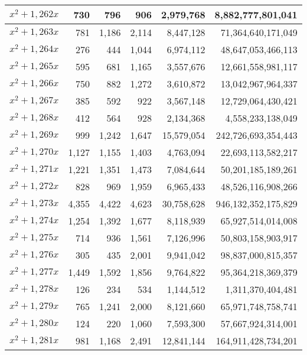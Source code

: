 \documentclass[a4paper]{amsproc}
\theoremstyle{plain}
\begin{document}
\begin{longtable}{ | l | r | r | r | r | r | }
$x^2 + 1{,}262x$ & 730 & 796 & 906 & 2{,}979{,}768 & 8{,}882{,}777{,}801{,}041 \\ \hline
$x^2 + 1{,}263x$ & 781 & 1{,}186 & 2{,}114 & 8{,}447{,}128 & 71{,}364{,}640{,}171{,}049 \\ \hline
$x^2 + 1{,}264x$ & 276 & 444 & 1{,}044 & 6{,}974{,}112 & 48{,}647{,}053{,}466{,}113 \\ \hline
$x^2 + 1{,}265x$ & 595 & 681 & 1{,}165 & 3{,}557{,}676 & 12{,}661{,}558{,}981{,}117 \\ \hline
$x^2 + 1{,}266x$ & 750 & 882 & 1{,}272 & 3{,}610{,}872 & 13{,}042{,}967{,}964{,}337 \\ \hline
$x^2 + 1{,}267x$ & 385 & 592 & 922 & 3{,}567{,}148 & 12{,}729{,}064{,}430{,}421 \\ \hline
$x^2 + 1{,}268x$ & 412 & 564 & 928 & 2{,}134{,}368 & 4{,}558{,}233{,}138{,}049 \\ \hline
$x^2 + 1{,}269x$ & 999 & 1{,}242 & 1{,}647 & 15{,}579{,}054 & 242{,}726{,}693{,}354{,}443 \\ \hline
$x^2 + 1{,}270x$ & 1{,}127 & 1{,}155 & 1{,}403 & 4{,}763{,}094 & 22{,}693{,}113{,}582{,}217 \\ \hline
$x^2 + 1{,}271x$ & 1{,}221 & 1{,}351 & 1{,}473 & 7{,}084{,}644 & 50{,}201{,}185{,}189{,}261 \\ \hline
$x^2 + 1{,}272x$ & 828 & 969 & 1{,}959 & 6{,}965{,}433 & 48{,}526{,}116{,}908{,}266 \\ \hline
$x^2 + 1{,}273x$ & 4{,}355 & 4{,}422 & 4{,}623 & 30{,}758{,}628 & 946{,}132{,}352{,}175{,}829 \\ \hline
$x^2 + 1{,}274x$ & 1{,}254 & 1{,}392 & 1{,}677 & 8{,}118{,}939 & 65{,}927{,}514{,}014{,}008 \\ \hline
$x^2 + 1{,}275x$ & 714 & 936 & 1{,}561 & 7{,}126{,}996 & 50{,}803{,}158{,}903{,}917 \\ \hline
$x^2 + 1{,}276x$ & 305 & 435 & 2{,}001 & 9{,}941{,}042 & 98{,}837{,}000{,}815{,}357 \\ \hline
$x^2 + 1{,}277x$ & 1{,}449 & 1{,}592 & 1{,}856 & 9{,}764{,}822 & 95{,}364{,}218{,}369{,}379 \\ \hline
$x^2 + 1{,}278x$ & 126 & 234 & 534 & 1{,}144{,}512 & 1{,}311{,}370{,}404{,}481 \\ \hline
$x^2 + 1{,}279x$ & 765 & 1{,}241 & 2{,}000 & 8{,}121{,}660 & 65{,}971{,}748{,}758{,}741 \\ \hline
$x^2 + 1{,}280x$ & 124 & 220 & 1{,}060 & 7{,}593{,}300 & 57{,}667{,}924{,}314{,}001 \\ \hline
$x^2 + 1{,}281x$ & 981 & 1{,}168 & 2{,}491 & 12{,}841{,}144 & 164{,}911{,}428{,}734{,}201 \\ \hline

\end{longtable}
\end{document}
